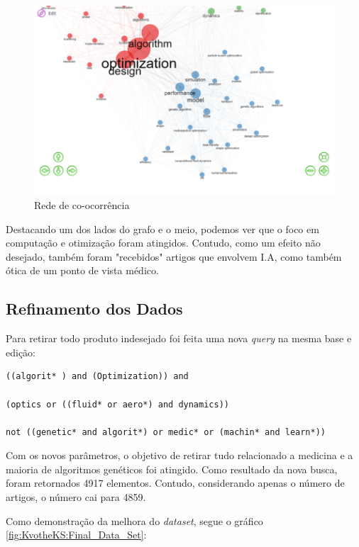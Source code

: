      \begin{figure}
    \centering
    \includegraphics[width=1\textwidth]{experiments/KvotheKS/PesqBibliogr/AlgoritmosSimulacaoOptica-Dinamica/WoS-20220202/OldQueryDataset/CoOccurrence.png}
    \caption{Rede de co-ocorrência}
    \label{fig:KvotheKS:OldQueryCoOccurrence}
\end{figure}
    
    Destacando um dos lados do grafo e o meio, podemos ver que o foco em computação e otimização foram atingidos. Contudo, como um efeito não desejado, também foram "recebidos" artigos que envolvem I.A, como também ótica de um ponto de vista médico.
    
\subsection{Refinamento dos Dados}
    Para retirar todo produto indesejado foi feita uma nova \emph{query} na mesma base e edição:
    
\begin{lstlisting}[basicstyle = \normalsize]
((algorit* ) and (Optimization)) and 

(optics or ((fluid* or aero*) and dynamics))

not ((genetic* and algorit*) or medic* or (machin* and learn*))
\end{lstlisting}

    Com os novos parâmetros, o objetivo de retirar tudo relacionado a medicina e a maioria de algoritmos genéticos foi atingido. Como resultado da nova busca, foram retornados 4917 elementos. Contudo, considerando apenas o número de artigos, o número cai para 4859.
    
    Como demonstração da melhora do \emph{dataset}, segue o gráfico \ref{fig:KvotheKS:Final_Data_Set}:
    
